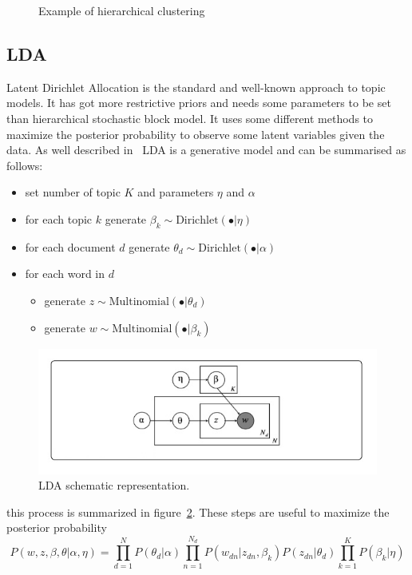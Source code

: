 \begin{figure}[htb!]
\begin{minipage}{0.35\textwidth}
	\end{minipage}
\caption{Example of hierarchical clustering}
\label{fig:topic/hc}
\end{figure}

\subsection{LDA}\label{sec:lda}
Latent Dirichlet Allocation is the standard and well-known approach to topic models. It has got more restrictive priors and needs some parameters to be set than hierarchical stochastic block model. It uses some different methods to maximize the posterior probability to observe some latent variables given the data.
As well described in~\cite{Zhou2016} LDA is a generative model and can be summarised as follows:
\begin{itemize}
	\item set number of topic $K$ and parameters $\eta$ and $\alpha$
	\item for each topic $k$ generate $\beta_k\sim \text{Dirichlet}(\bullet |\eta)$
	\item for each document $d$ generate $\theta_d\sim \text{Dirichlet}(\bullet|\alpha)$
	\item for each word in $d$ 
	\begin{itemize}
		\item generate $z\sim \text{Multinomial}(\bullet|\theta_d)$
		\item generate $w\sim \text{Multinomial}(\bullet|\beta_k)$
	\end{itemize}
\end{itemize}
\begin{figure}[htb!]
	\centering
	\includegraphics[width=0.65\linewidth]{pictures/topic/LDA.jpeg}
	\caption{LDA schematic representation.}
	\label{fig:LDA}
\end{figure}
this process is summarized in figure~\ref{fig:LDA}. These steps are useful to maximize the posterior probability
\begin{equation}\label{eq:lda}
P(w, z,\beta, \theta| \alpha, \eta)=\prod_{d=1}^N P(\theta_d | \alpha)\prod_{n=1}^{N_d} P(w_{dn}|z_{dn},\beta_k)P(z_{dn}|\theta_d)\prod_{k=1}^KP(\beta_k|\eta)
\end{equation}
